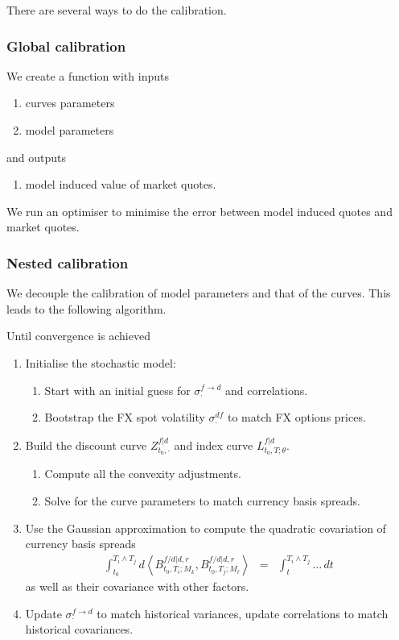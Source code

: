 \documentclass[11pt,english]{amsart}
\newcommand{\Cov}{\mathrm{Cov}}
\theoremstyle{definition}
\begin{document}
There are several ways to do the calibration.

\subsubsection{Global calibration}%
We create a function with inputs 
\begin{enumerate}
\item curves parameters
\item model parameters
\end{enumerate}
and outputs 
\begin{enumerate}
\item model induced value of market quotes.  
\end{enumerate}
We run an optimiser to minimise the error between model induced quotes and market quotes.



\subsubsection{Nested calibration}%
We decouple the calibration of model parameters and that of the curves. This leads to the following algorithm.

Until convergence is achieved
\begin{enumerate}
\item Initialise the stochastic model:
\begin{enumerate}
\item Start with an initial guess for $\sigma^{f\to d}_\cdot$ and correlations.
\item Bootstrap the FX spot volatility $\sigma^{df}_\cdot$ to match FX options prices.
\end{enumerate}
\item Build the discount curve $Z^{f|d}_{t_0,\cdot}$ and index curve $L^{f|d}_{t_0,T;\theta}$.
\begin{enumerate}
\item Compute all the convexity adjustments.  
\item Solve for the curve parameters to match currency basis spreads.
\end{enumerate}
\item Use the Gaussian approximation to compute the quadratic covariation of currency basis spreads 
\begin{eqnarray}
  \int_{t_0}^{T_i\wedge T_j} d \left\langle B^{f/d|d,r}_{t_0,T_i;M_k}, B^{f/d|d,r}_{t_0,T_j;M_\ell} \right\rangle
  &=& \int_t^{T_i\wedge T_j}  \ldots \, dt 
\end{eqnarray}
as well as their covariance with other factors.
\item Update $\sigma^{f\to d}_\cdot$ to match historical variances, update correlations to match historical covariances.
\end{enumerate}
\end{document}
